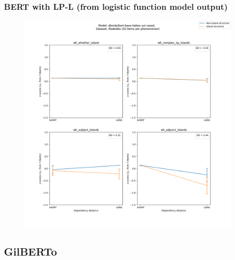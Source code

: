 \subsubsection{BERT with LP-L (from logistic function model output)}
\begin{figure}[h]
	\centering
	\includegraphics[width=1\textwidth]{images/AppendixA/Madeddu_wh_dbmdz_bert-base-italian-xxl-cased_LL-zscores-likert-2022-07-11.png} 
\end{figure}

\clearpage
\subsection{GilBERTo}

